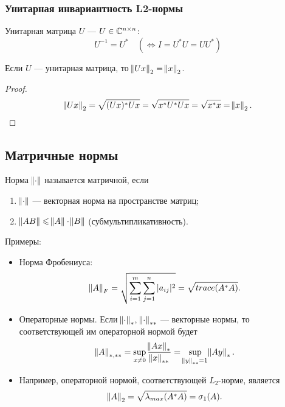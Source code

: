 \subsubsection{Унитарная инвариантность L2-нормы}

\begin{definition}
    Унитарная матрица $U$ --- $U \in \mathbb{C}^{n\times n}$:
    \[
        U^{-1} = U^* \quad (\Leftrightarrow I = U^* U = U U^*)
    \]
\end{definition}

\begin{point}
    Если $U$ --- унитарная матрица, то $\norm{U x}_2 = \norm{x}_2$.
\end{point}

\begin{proof}
    \[
        \norm{U x}_2 = \sqrt{(U x)^* U x} = \sqrt{x^* U^* U x} = \sqrt{x^* x}
        = \norm{x}_2.
    \]
\end{proof}

\subsection{Матричные нормы}

\begin{definition}
    Норма $\norm{\cdot}$ называется матричной, если
    \begin{enumerate}
        \item $\norm{\cdot}$ --- векторная норма на пространстве матриц;
        \item $\norm{A B} \leqslant \norm{A} \cdot \norm{B}$ (субмультипликативность).
    \end{enumerate}
\end{definition}

Примеры:

\begin{itemize}
    \item Норма Фробениуса:
        \[
            \norm{A}_F = \sqrt{\sum_{i = 1}^m \sum_{j = 1}^n |a_{i j}|^2}
            = \sqrt{trace(A^* A)}.
        \]
    \item Операторные нормы. Если $\norm{\cdot}_*$,\; $\norm{\cdot}_{**}$
        --- векторные нормы, то соответствующей им операторной нормой будет
        \[
            \norm{A}_{*, **} = \sup_{x \ne 0} \frac{\norm{A x}_*}{\norm{x}_{**}}
            = \sup_{\norm{y}_{**} = 1} \norm{A y}_{*}.
        \]
    \item Например, операторной нормой, соответствующей $L_2$-норме, является
        \[
            \norm{A}_2 = \sqrt{\lambda_{max}(A^* A)} = \sigma_1(A).
        \]
\end{itemize}


